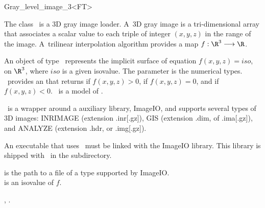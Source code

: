 

\begin{ccRefClass}{Gray_level_image_3<FT>}  %


\ccDefinition

The class \ccRefName\ is a 3D gray image loader. A~3D gray image is a
tri-dimensional array that associates a scalar value to each triple of
integer $(x, y, z)$ in the range of the image. A~trilinear interpolation
algorithm provides a map \begin{math}f : \R^3 \longrightarrow \R\end{math}.

An object of type \ccRefName\ represents the implicit surface of equation
$f(x,y,z) = iso$, on $\R^3$, where $iso$ is a given isovalue. The parameter
 is the numerical types. \ccRefName\ provides an  that returns  if $f(x,y,z)>0$,  if
$f(x,y,z)=0$, and  if $f(x,y,z)<0$. \ccRefName\ is a model of
.

\ccRefName\ is a wrapper around a auxiliary library, ImageIO, and supports
several types of 3D images: INRIMAGE (extension .inr[.gz]), GIS (extension
.dim, of .ima[.gz]), and ANALYZE (extension .hdr, or .img[.gz]).

An executable that uses \ccRefName\ must be linked with the ImageIO
library. This library is shipped with \cgal\ in the
 subdirectory.


\ccIsModel


\ccTypes


\ccCreation
{}

{ is the path to a file of a type supported by ImageIO.\\
 is an isovalue of $f$.
}

\ccSeeAlso

,
.

\end{ccRefClass}



